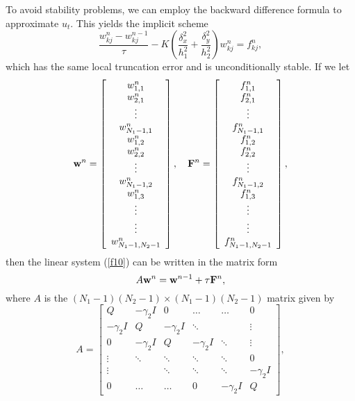 \vskip 0.3cm  
To avoid stability problems, we can employ the backward difference
formula to approximate $u_t$. This yields
the implicit scheme
\begin{equation}
\frac{w_{kj}^{n}-w_{kj}^{n-1}}{\tau} -K\left(
\frac{\delta_{x}^2}{h_{1}^2}+\frac{\delta_{y}^2}{h_{2}^2}\right)w_{kj}^{n}=f_{kj}^n, \label{f10}
\end{equation}
which has the same local truncation error and is unconditionally
stable.
If we let
\begin{equation}
{\bf w}^{n}=\left[
\begin{array}{c}
w_{1,1}^{n} \\
w_{2,1}^{n} \\
\vdots \\
w_{N_{1}-1,1}^{n} \\
w_{1,2}^{n} \\
w_{2,2}^{n} \\
\vdots \\
w_{N_{1}-1,2}^{n} \\
w_{1,3}^{n} \\
\vdots \\
\vdots \\
w_{N_{1}-1,N_{2}-1}^{n}
\end{array}\right],
\quad {\bf F}^{n}=\left[
\begin{array}{c}
f_{1,1}^{n} \\
f_{2,1}^{n} \\
\vdots \\
f_{N_{1}-1,1}^{n} \\
f_{1,2}^{n} \\
f_{2,2}^{n}\\
\vdots \\
f_{N_{1}-1,2}^{n} \\
f_{1,3}^{n} \\
\vdots \\
\vdots \\
f_{N_{1}-1,N_{2}-1}^{n}
\end{array}\right],
\label{eee8}
\end{equation}
then the linear system (\ref{f10}) can be written in the matrix form
\begin{equation}
A{\bf w}^{n}={\bf w}^{n-1}+\tau{\bf F}^{n}, \label{eee9}
\end{equation}
where $A$ is the $(N_{1}-1)(N_{2}-1)\times(N_{1}-1)(N_{2}-1)$ matrix given by
\begin{equation}
A=\left[
\begin{array}{cccccc}
Q &-\gamma_{2}I &0      &\dots  &\dots &0 \\
-\gamma_{2}I &Q &-\gamma_{2}I &\ddots  &     &\vdots \\
0      &-\gamma_{2}I &Q &-\gamma_{2}I &\ddots &\vdots \\
\vdots &\ddots &\ddots &\ddots &\ddots &0 \\
\vdots &       &\ddots &\ddots &\ddots &-\gamma_{2}I \\
0      &\dots  &\dots  &0      &-\gamma_{2}I &Q
\end{array}\right], \label{eee10}
\end{equation}
